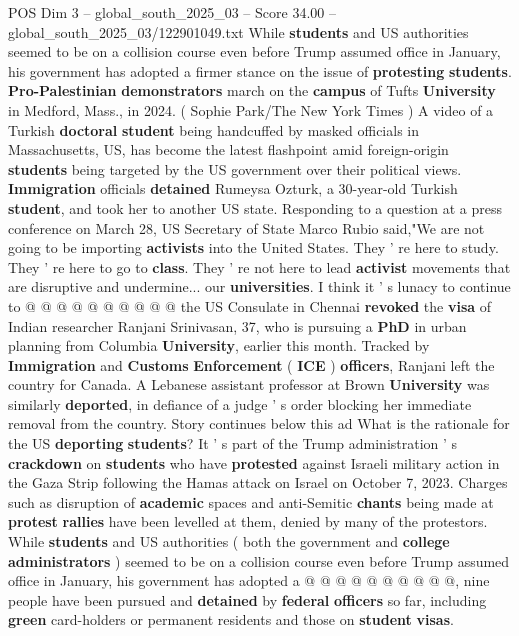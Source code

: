 \begin{textsample}{POS Dim 3 – global\_south\_2025\_03 – Score 34.00 – global\_south\_2025\_03/122901049.txt}  \label{ex:f3_pos_033}
While \textbf{students} and US authorities seemed to be on a collision course even before Trump assumed office in January, his government has adopted a firmer stance on the issue of \textbf{protesting} \textbf{students}. \textbf{Pro-Palestinian} \textbf{demonstrators} march on the \textbf{campus} of Tufts \textbf{University} in Medford, Mass., in 2024. ( Sophie Park/The New York Times ) A video of a Turkish \textbf{doctoral} \textbf{student} being handcuffed by masked officials in Massachusetts, US, has become the latest flashpoint amid foreign-origin \textbf{students} being targeted by the US government over their political views. \textbf{Immigration} officials \textbf{detained} Rumeysa Ozturk, a 30-year-old Turkish \textbf{student}, and took her to another US state.
Responding to a question at a press conference on March 28, US Secretary of State Marco Rubio said,"We are not going to be importing \textbf{activists} into the United States.
They ' re here to study.
They ' re here to go to \textbf{class}.
They ' re not here to lead \textbf{activist} movements that are disruptive and undermine... our \textbf{universities}.
I think it ' s lunacy to continue to @ @ @ @ @ @ @ @ @ @ the US Consulate in Chennai \textbf{revoked} the \textbf{visa} of Indian researcher Ranjani Srinivasan, 37, who is pursuing a \textbf{PhD} in urban planning from Columbia \textbf{University}, earlier this month.
Tracked by \textbf{Immigration} and \textbf{Customs} \textbf{Enforcement} ( \textbf{ICE} ) \textbf{officers}, Ranjani left the country for Canada.
A Lebanese assistant professor at Brown \textbf{University} was similarly \textbf{deported}, in defiance of a judge ' s order blocking her immediate removal from the country.
Story continues below this ad What is the rationale for the US \textbf{deporting} \textbf{students}?
It ' s part of the Trump administration ' s \textbf{crackdown} on \textbf{students} who have \textbf{protested} against Israeli military action in the Gaza Strip following the Hamas attack on Israel on October 7, 2023.
Charges such as disruption of \textbf{academic} spaces and anti-Semitic \textbf{chants} being made at \textbf{protest} \textbf{rallies} have been levelled at them, denied by many of the protestors.
While \textbf{students} and US authorities ( both the government and \textbf{college} \textbf{administrators} ) seemed to be on a collision course even before Trump assumed office in January, his government has adopted a @ @ @ @ @ @ @ @ @ @, nine people have been pursued and \textbf{detained} by \textbf{federal} \textbf{officers} so far, including \textbf{green} card-holders or permanent residents and those on \textbf{student} \textbf{visas}.

\end{textsample}
